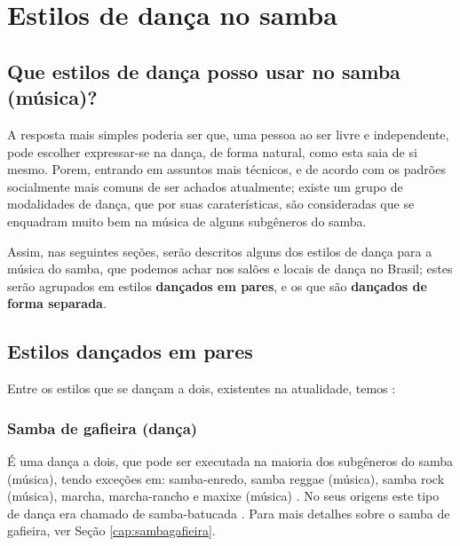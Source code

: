 
\chapter{Estilos de dança no samba}

\section{Que estilos de dança posso usar no samba (música)?}
\label{subsec:estilosdedanca}
A resposta mais simples poderia ser que, uma pessoa ao ser livre e independente,
pode escolher expressar-se na dança, de forma natural, como esta saia de si mesmo.
Porem, entrando em assuntos mais técnicos, 
e de acordo com os padrões socialmente mais comuns de ser achados atualmente;
existe um grupo de modalidades de dança, que por suas caraterísticas, 
são consideradas que se enquadram muito bem na música de alguns subgêneros do samba.

Assim, nas seguintes seções, serão descritos alguns dos estilos de dança para a música do samba,  
que podemos achar nos salões e locais de dança no Brasil;
estes serão agrupados em estilos \textbf{dançados em pares}, e os que são \textbf{dançados de forma separada}. 


\section{Estilos dançados em pares}
\label{subsec:estilosdedancapares}
Entre os estilos que se dançam a dois, existentes na atualidade, temos \cite[pp. 134]{perna2002samba}:

\subsection{Samba de gafieira (dança)} 
É uma dança a dois, que pode ser executada na maioria dos subgêneros do samba (música),
tendo exceções em: samba-enredo, samba reggae (música), samba rock (música), 
marcha, marcha-rancho e maxixe (música) \cite[pp. 134]{perna2002samba}.
No seus origens este tipo de dança era chamado de samba-batucada  \cite[pp. 134]{perna2002samba}. 
Para mais detalhes sobre o samba de gafieira, ver Seção \ref{cap:sambagafieira}.

